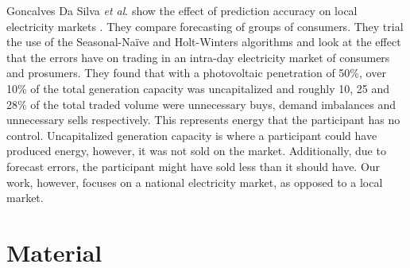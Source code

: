 \documentclass[final,3p,times,twocolumn,numbers]{elsarticle}
\begin{document}
Goncalves Da Silva \textit{et al}. show the effect of prediction accuracy on local electricity markets \cite{GoncalvesDaSilva2014}. They compare forecasting of groups of consumers. They trial the use of the Seasonal-Naïve and Holt-Winters algorithms and look at the effect that the errors have on trading in an intra-day electricity market of consumers and prosumers. They found that with a photovoltaic penetration of 50\%, over 10\% of the total generation capacity was uncapitalized and roughly 10, 25 and 28\% of the total traded volume were unnecessary buys, demand imbalances and unnecessary sells respectively. This represents energy that the participant has no control. Uncapitalized generation capacity is where a participant could have produced energy, however, it was not sold on the market. Additionally, due to forecast errors, the participant might have sold less than it should have. Our work, however, focuses on a national electricity market, as opposed to a local market.





\section{Material}
\label{sec:material}
%
%





\end{document}
